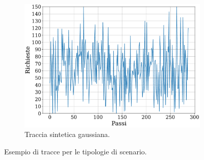 \documentclass[a4paper, twocolumn]{article}
\begin{document}
\begin{figure}
    \begin{subfigure}{\columnwidth}
        \centering
        \includegraphics[width=\linewidth]{assets/5/requests_normal_64425_single_agent.pdf}
        \caption{Traccia sintetica gaussiana.}
    \end{subfigure}
    
    \caption{Esempio di tracce per le tipologie di scenario.}
    \label{fig:input_requests_type}
\end{figure}
\end{document}
